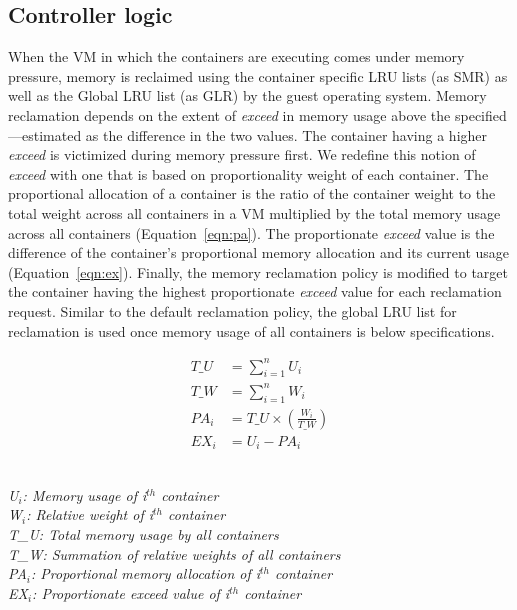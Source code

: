       \subsection{Controller logic}
	When the VM in which the containers are executing comes under memory pressure, memory is reclaimed using the container specific LRU lists 
	(as SMR) as well as the Global LRU list (as GLR) by the guest operating system.
	Memory reclamation depends on the extent of \textit{exceed} in memory usage above the specified \sol---estimated as the difference 
	in the two values. 
	The container having a higher \textit{exceed} is victimized during memory pressure first.
	We redefine this notion of \textit{exceed} with one that is based on proportionality weight of each container. 
	The proportional allocation of a container is the ratio of the container weight to the total weight across all containers in a 
	VM multiplied by the total memory usage across all containers (Equation~\ref{eqn:pa}). The proportionate \textit{exceed} value is the 
	difference of the container's proportional memory allocation and its current usage (Equation~\ref{eqn:ex}). 
	Finally, the memory reclamation policy is modified to target the container having  the highest proportionate \textit{exceed} value for each
	reclamation request. Similar to the default reclamation policy, the global LRU list for reclamation is used once memory usage 
	of all containers is below \sol{} specifications.
	
	\small
	\begin{align}
	  T\_U &= \sum_{i=1}^{n}U_{i} \\
	  T\_W &= \sum_{i=1}^{n}W_{i} \\
	  PA_{i} &= T\_U \times (\frac{W_{i}}{T\_W}) \label{eqn:pa}\\
	  EX_{i} &= U_{i} - PA_{i} \label{eqn:ex}
	\end{align}

	\footnotesize
	\textit{
	\\
	U$_{i}$: Memory usage of i$^{th}$ container \\
	W$_{i}$: Relative weight of i$^{th}$ container \\
	T\_U: Total memory usage by all containers \\
	T\_W: Summation of relative weights of all containers \\
	PA$_{i}$: Proportional memory allocation of i$^{th}$  container \\
	EX$_{i}$: Proportionate exceed value of i$^{th}$ container
	}
	\normalsize
    
